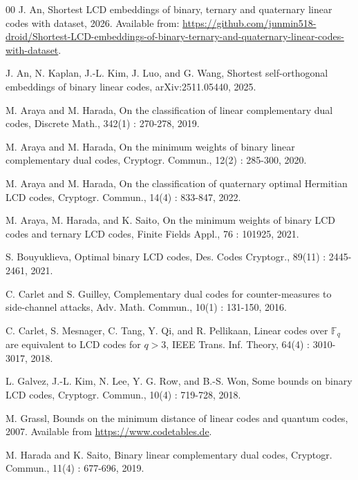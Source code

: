 \documentclass{article}
\theoremstyle{definition}
\theoremstyle{remark}
\begin{document}
\begin{thebibliography}{00}
     J. An, Shortest LCD embeddings of binary, ternary and quaternary linear codes with dataset, 2026. Available from: \url{https://github.com/junmin518-droid/Shortest-LCD-embeddings-of-binary-ternary-and-quaternary-linear-codes-with-dataset}.


     J. An, N. Kaplan, J.-L. Kim, J. Luo, and G. Wang, Shortest self-orthogonal embeddings of binary linear codes, arXiv:2511.05440, 2025.

     M. Araya and M. Harada, On the classification of linear complementary dual codes, Discrete Math., 342(1) : 270-278, 2019.

     M. Araya and M. Harada, On the minimum weights of binary linear complementary dual codes, Cryptogr. Commun., 12(2) : 285-300, 2020.

     M. Araya and M. Harada, On the classification of quaternary optimal Hermitian LCD codes, Cryptogr. Commun., 14(4) : 833-847, 2022.

     M. Araya, M. Harada, and K. Saito, On the minimum weights of binary LCD codes and ternary LCD codes, Finite Fields Appl., 76 : 101925, 2021.

     S. Bouyuklieva, Optimal binary LCD codes, Des. Codes Cryptogr., 89(11) : 2445-2461, 2021.

     C. Carlet and S. Guilley, Complementary dual codes for counter-measures to side-channel attacks, Adv. Math. Commun., 10(1) : 131-150, 2016.

     C. Carlet, S. Mesnager, C. Tang, Y. Qi, and R. Pellikaan, Linear codes over $\mathbb{F}_q$ are equivalent to LCD codes for $q>3$, IEEE Trans. Inf. Theory, 64(4) : 3010-3017, 2018.

     L. Galvez, J.-L. Kim, N. Lee, Y. G. Row, and B.-S. Won, Some bounds on binary LCD codes, Cryptogr. Commun., 10(4) : 719-728, 2018.

     M. Grassl, Bounds on the minimum distance of linear codes and quantum codes, 2007. Available from \url{https://www.codetables.de}.

     M. Harada and K. Saito, Binary linear complementary dual codes, Cryptogr. Commun., 11(4) : 677-696, 2019.


\end{thebibliography}
\end{document}
